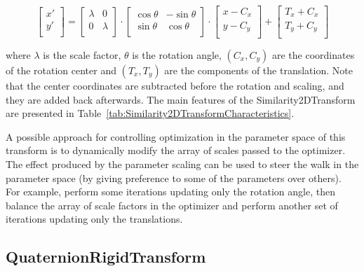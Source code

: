 \begin{equation}
\left[ 
\begin{array}{c}
x' \\
y' \\
\end{array}
\right]
=
\left[ 
\begin{array}{cc}
\lambda &    0     \\
   0    &  \lambda \\
\end{array}
\right]
\cdot
\left[ 
\begin{array}{cc}
\cos{\theta} & -\sin{\theta} \\
\sin{\theta} &  \cos{\theta} \\
\end{array}
\right]
\cdot
\left[ 
\begin{array}{c}
x - C_x \\
y - C_y \\
\end{array}
\right]
+ 
\left[ 
\begin{array}{c}
T_x + C_x \\
T_y + C_y \\
\end{array}
\right]
\end{equation}

where $\lambda$ is the scale factor, $\theta$ is the rotation angle,
$(C_x,C_y)$ are the coordinates of the rotation center and $(T_x,T_y)$ are the
components of the translation. Note that the center coordinates are subtracted
before the rotation and scaling, and they are added back afterwards.  The main
features of the Similarity2DTransform are presented in
Table~\ref{tab:Similarity2DTransformCharacteristics}.


A possible approach for controlling optimization in the parameter space of
this transform is to dynamically modify the array of scales passed to the
optimizer. The effect produced by the parameter scaling can be used to steer
the walk in the parameter space (by giving preference to some of the
parameters over others). For example, perform some iterations updating only
the rotation angle, then balance the array of scale factors in the optimizer
and perform another set of iterations updating only the translations.


\subsection{QuaternionRigidTransform}
\label{sec:QuaternionRigidTransform}

